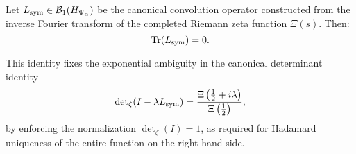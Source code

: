 \begin{theorem}
\label{thm:trace_zero_Lsym}
Let \( L_{\mathrm{sym}} \in \mathcal{B}_1(H_{\Psi_\alpha}) \) be the canonical convolution operator constructed from the inverse Fourier transform of the completed Riemann zeta function \( \Xi(s) \). Then:
\[
\operatorname{Tr}(L_{\mathrm{sym}}) = 0.
\]

This identity fixes the exponential ambiguity in the canonical determinant identity
\[
\det\nolimits_{\zeta}(I - \lambda L_{\mathrm{sym}}) = \frac{\Xi\left( \tfrac{1}{2} + i\lambda \right)}{\Xi\left( \tfrac{1}{2} \right)},
\]
by enforcing the normalization \( \det\nolimits_{\zeta}(I) = 1 \), as required for Hadamard uniqueness of the entire function on the right-hand side.
\end{theorem}
